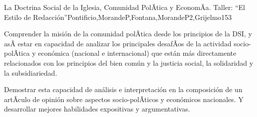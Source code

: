 \begin{syllabus}
\begin{unit}{La Doctrina Social de la Iglesia, Comunidad PolÃ­tica y EconomÃ­a. Taller: ``El Estilo de Redacción''}{Pontificio,MorandeP,Fontana,MorandeP2,Grijelmo}{15}{3}
\begin{topics}
\end{topics}
\begin{unitgoals}
	\item Comprender la misión de la comunidad polÃ­tica desde los principios de la DSI, y asÃ­ estar en capacidad de analizar los principales desafÃ­os de la actividad socio-polÃ­tica y económica (nacional e internacional) que están más directamente relacionados con los principios del bien común y la justicia social, la solidaridad y la subsidiariedad.
	\item Demostrar esta capacidad de análisis e interpretación en la composición de un artÃ­culo de opinión sobre aspectos socio-polÃ­ticos y económicos nacionales. Y desarrollar mejores habilidades expositivas y argumentativas.
\end{unitgoals}
\end{unit}



\begin{coursebibliography}
\end{coursebibliography}
\end{syllabus}
